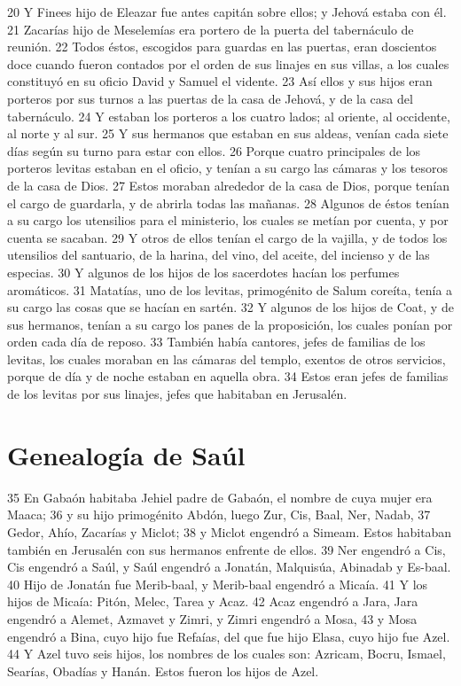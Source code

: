 20 Y Finees hijo de Eleazar fue antes capitán sobre ellos; y Jehová estaba con él.
21 Zacarías hijo de Meselemías era portero de la puerta del tabernáculo de reunión.
22 Todos éstos, escogidos para guardas en las puertas, eran doscientos doce cuando fueron contados por el orden de sus linajes en sus villas, a los cuales constituyó en su oficio David y Samuel el vidente.
23 Así ellos y sus hijos eran porteros por sus turnos a las puertas de la casa de Jehová, y de la casa del tabernáculo.
24 Y estaban los porteros a los cuatro lados; al oriente, al occidente, al norte y al sur.
25 Y sus hermanos que estaban en sus aldeas, venían cada siete días según su turno para estar con ellos.
26 Porque cuatro principales de los porteros levitas estaban en el oficio, y tenían a su cargo las cámaras y los tesoros de la casa de Dios.
27 Estos moraban alrededor de la casa de Dios, porque tenían el cargo de guardarla, y de abrirla todas las mañanas.
28 Algunos de éstos tenían a su cargo los utensilios para el ministerio, los cuales se metían por cuenta, y por cuenta se sacaban.
29 Y otros de ellos tenían el cargo de la vajilla, y de todos los utensilios del santuario, de la harina, del vino, del aceite, del incienso y de las especias.
30 Y algunos de los hijos de los sacerdotes hacían los perfumes aromáticos.
31 Matatías, uno de los levitas, primogénito de Salum coreíta, tenía a su cargo las cosas que se hacían en sartén.
32 Y algunos de los hijos de Coat, y de sus hermanos, tenían a su cargo los panes de la proposición, los cuales ponían por orden cada día de reposo.
33 También había cantores, jefes de familias de los levitas, los cuales moraban en las cámaras del templo, exentos de otros servicios, porque de día y de noche estaban en aquella obra.
34 Estos eran jefes de familias de los levitas por sus linajes, jefes que habitaban en Jerusalén.

\section*{Genealogía de Saúl}

35 En Gabaón habitaba Jehiel padre de Gabaón, el nombre de cuya mujer era Maaca;
36 y su hijo primogénito Abdón, luego Zur, Cis, Baal, Ner, Nadab,
37 Gedor, Ahío, Zacarías y Miclot;
38 y Miclot engendró a Simeam. Estos habitaban también en Jerusalén con sus hermanos enfrente de ellos.
39 Ner engendró a Cis, Cis engendró a Saúl, y Saúl engendró a Jonatán, Malquisúa, Abinadab y Es-baal.
40 Hijo de Jonatán fue Merib-baal, y Merib-baal engendró a Micaía.
41 Y los hijos de Micaía: Pitón, Melec, Tarea y Acaz.
42 Acaz engendró a Jara, Jara engendró a Alemet, Azmavet y Zimri, y Zimri engendró a Mosa,
43 y Mosa engendró a Bina, cuyo hijo fue Refaías, del que fue hijo Elasa, cuyo hijo fue Azel.
44 Y Azel tuvo seis hijos, los nombres de los cuales son: Azricam, Bocru, Ismael, Searías, Obadías y Hanán. Estos fueron los hijos de Azel.

